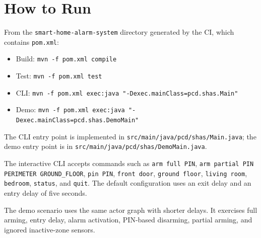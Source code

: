 \section{How to Run}

From the \texttt{smart-home-alarm-system} directory generated by the CI,
which contains \texttt{pom.xml}:

\begin{itemize}
  \item Build: \texttt{mvn -f pom.xml compile}
  \item Test: \texttt{mvn -f pom.xml test}
  \item CLI: \texttt{mvn -f pom.xml exec:java "-Dexec.mainClass=pcd.shas.Main"}
  \item Demo: \texttt{mvn -f pom.xml exec:java "-Dexec.mainClass=pcd.shas.DemoMain"}
\end{itemize}

The CLI entry point is implemented in
\texttt{src/main/java/pcd/shas/Main.java}; the demo entry point is in
\texttt{src/main/java/pcd/shas/DemoMain.java}.

The interactive CLI accepts commands such as \texttt{arm full PIN}, \texttt{arm partial PIN PERIMETER GROUND\_FLOOR},
\texttt{pin PIN}, \texttt{front door}, \texttt{ground floor}, \texttt{living room}, \texttt{bedroom},
\texttt{status}, and \texttt{quit}.
The default configuration uses an exit delay and an entry delay of five seconds.

The demo scenario uses the same actor graph with shorter delays.
It exercises full arming, entry delay, alarm activation, PIN-based disarming, partial arming, and ignored inactive-zone
sensors.
